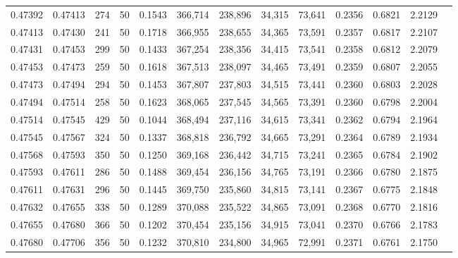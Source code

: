 \begin{tabular}{rrrrrrrrrrrrr}
0.47392 & 0.47413 &   274 &  50 &                                     0.1543 & 366,714 & 238,896 &  34,315 &  73,641 & 0.2356 & 0.6821 & 2.2129 \\
0.47413 & 0.47430 &   241 &  50 &                                     0.1718 & 366,955 & 238,655 &  34,365 &  73,591 & 0.2357 & 0.6817 & 2.2107 \\
0.47431 & 0.47453 &   299 &  50 &                                     0.1433 & 367,254 & 238,356 &  34,415 &  73,541 & 0.2358 & 0.6812 & 2.2079 \\
0.47453 & 0.47473 &   259 &  50 &                                     0.1618 & 367,513 & 238,097 &  34,465 &  73,491 & 0.2359 & 0.6807 & 2.2055 \\
0.47473 & 0.47494 &   294 &  50 &                                     0.1453 & 367,807 & 237,803 &  34,515 &  73,441 & 0.2360 & 0.6803 & 2.2028 \\
0.47494 & 0.47514 &   258 &  50 &                                     0.1623 & 368,065 & 237,545 &  34,565 &  73,391 & 0.2360 & 0.6798 & 2.2004 \\
0.47514 & 0.47545 &   429 &  50 &                                     0.1044 & 368,494 & 237,116 &  34,615 &  73,341 & 0.2362 & 0.6794 & 2.1964 \\
0.47545 & 0.47567 &   324 &  50 &                                     0.1337 & 368,818 & 236,792 &  34,665 &  73,291 & 0.2364 & 0.6789 & 2.1934 \\
0.47568 & 0.47593 &   350 &  50 &                                     0.1250 & 369,168 & 236,442 &  34,715 &  73,241 & 0.2365 & 0.6784 & 2.1902 \\
0.47593 & 0.47611 &   286 &  50 &                                     0.1488 & 369,454 & 236,156 &  34,765 &  73,191 & 0.2366 & 0.6780 & 2.1875 \\
0.47611 & 0.47631 &   296 &  50 &                                     0.1445 & 369,750 & 235,860 &  34,815 &  73,141 & 0.2367 & 0.6775 & 2.1848 \\
0.47632 & 0.47655 &   338 &  50 &                                     0.1289 & 370,088 & 235,522 &  34,865 &  73,091 & 0.2368 & 0.6770 & 2.1816 \\
0.47655 & 0.47680 &   366 &  50 &                                     0.1202 & 370,454 & 235,156 &  34,915 &  73,041 & 0.2370 & 0.6766 & 2.1783 \\
0.47680 & 0.47706 &   356 &  50 &                                     0.1232 & 370,810 & 234,800 &  34,965 &  72,991 & 0.2371 & 0.6761 & 2.1750 \\

\end{tabular}

